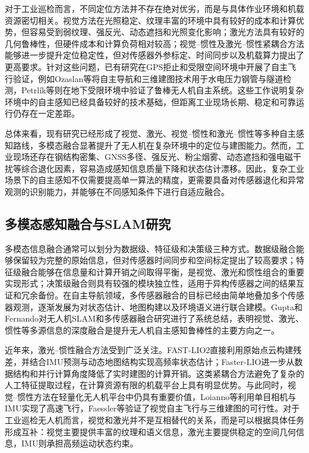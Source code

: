 对于工业巡检而言，不同定位方法并不存在绝对优劣，而是与具体作业环境和机载资源密切相关。视觉方法在光照稳定、纹理丰富的环境中具有较好的成本和计算优势，但容易受到弱纹理、强反光、动态遮挡和光照变化影响；激光方法具有较好的几何鲁棒性，但硬件成本和计算负荷相对较高；视觉--惯性及激光--惯性紧耦合方法能够进一步提升定位稳定性，但对传感器外参标定、时间同步以及机载算力提出了更高要求。针对这些问题，已有研究在GPS拒止和受限空间环境中开展了自主飞行验证，例如Ozaslan等将自主导航和三维建图技术用于水电压力钢管与隧道检测\cite{ozaslan2017autonomous}，Petrlík等则在地下受限环境中验证了鲁棒无人机自主系统\cite{petrlik2020robust}。这些工作说明复杂环境中的自主感知已经具备较好的技术基础，但距离工业现场长期、稳定和可靠运行仍存在一定差距。

总体来看，现有研究已经形成了视觉、激光、视觉--惯性和激光--惯性等多种自主感知路线，多模态融合显著提升了无人机在复杂环境中的定位与建图能力。然而，工业现场还存在钢结构密集、GNSS多径、强反光、粉尘烟雾、动态遮挡和强电磁干扰等综合退化因素，容易造成感知信息质量下降和状态估计漂移\cite{lvyang2019sense,stoecker2017review,petrlik2020robust}。因此，复杂工业场景下的自主感知不仅需要提高单一算法的精度，更需要具备对传感器退化和异常观测的识别能力，并能够在不同感知条件下进行自适应融合。

\subsection{多模态感知融合与SLAM研究}

多模态信息融合通常可以划分为数据级、特征级和决策级三种方式。数据级融合能够保留较为完整的原始信息，但对传感器时间同步和空间标定提出了较高要求；特征级融合能够在信息量和计算开销之间取得平衡，是视觉、激光和惯性组合的重要实现形式；决策级融合则具有较强的模块独立性，适用于异构传感器之间的结果互证和冗余备份\cite{panq2003basic,hey2000multi}。在自主导航领域，多传感器融合的目标已经由简单地叠加多个传感器观测，逐渐发展为对状态估计、地图构建以及环境语义进行联合建模。Gupta和Fernando\cite{gupta2022slam}对无人机SLAM和多传感器融合研究进行了系统总结，表明视觉、激光、惯性等多源信息的深度融合是提升无人机自主感知鲁棒性的主要方向之一。

近年来，激光--惯性融合方法受到广泛关注。FAST-LIO2\cite{xu2022fast}直接利用原始点云构建残差，并结合IMU预测与动态地图结构实现高频率状态估计；Faster-LIO\cite{bai2022fasterlio}进一步从数据结构和并行计算角度降低了实时建图的计算开销。这类紧耦合方法避免了复杂的人工特征提取过程，在计算资源有限的机载平台上具有明显优势。与此同时，视觉--惯性方法在轻量化无人机平台中仍具有重要价值，Loianno等利用单目相机与IMU实现了高速飞行\cite{loianno2017estimation}，Faessler等验证了视觉自主飞行与三维建图的可行性\cite{faessler2016autonomous}。对于工业巡检无人机而言，视觉和激光并不是互相替代的关系，而是可以根据具体任务形成互补：视觉主要提供丰富的纹理和语义信息，激光主要提供稳定的空间几何信息，IMU则承担高频运动状态约束。

